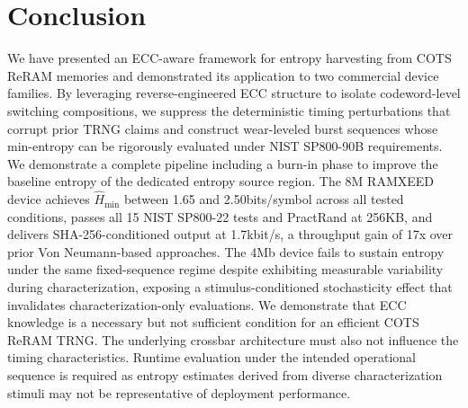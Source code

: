 \section{Conclusion}
We have presented an ECC-aware framework for entropy harvesting from COTS ReRAM memories and demonstrated its application to two commercial device families.  By leveraging reverse-engineered ECC structure to isolate codeword-level switching compositions, we suppress the deterministic timing perturbations that corrupt prior TRNG claims and construct wear-leveled burst sequences whose min-entropy can be rigorously evaluated under NIST SP800-90B requirements. We demonstrate a complete pipeline including a burn-in phase to improve the baseline entropy of the dedicated entropy source region.
The 8M RAMXEED device achieves $\hat{H}_{\min}$ between 1.65 and 2.50bits/symbol across all tested conditions, passes all 15 NIST SP800-22 tests and PractRand at 256KB, and delivers SHA-256-conditioned output at 1.7kbit/s, a throughput gain of 17x over prior Von Neumann-based approaches. The 4Mb device fails to sustain entropy under the same fixed-sequence regime despite exhibiting measurable variability during characterization, exposing a stimulus-conditioned stochasticity effect that invalidates characterization-only evaluations. We demonstrate that ECC knowledge is a necessary but not sufficient condition for an efficient COTS ReRAM TRNG. The underlying crossbar architecture must also not influence the timing characteristics. Runtime evaluation under the intended operational sequence is required as entropy estimates derived from diverse characterization stimuli may not be representative of deployment performance.